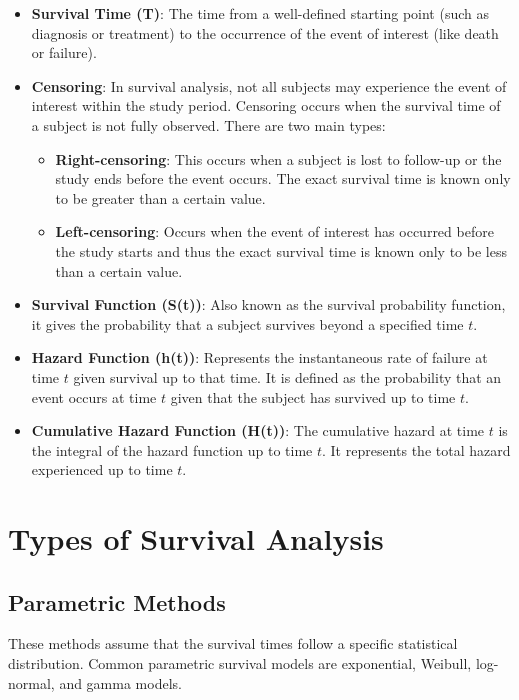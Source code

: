 \documentclass[12pt]{report}
\begin{document}
\begin{itemize}
    \item \textbf{Survival Time (T)}: The time from a well-defined starting point (such as diagnosis or treatment) to the occurrence of the event of interest (like death or failure).
    \item \textbf{Censoring}: In survival analysis, not all subjects may experience the event of interest within the study period. Censoring occurs when the survival time of a subject is not fully observed. There are two main types:
    \begin{itemize}
        \item \textbf{Right-censoring}: This occurs when a subject is lost to follow-up or the study ends before the event occurs. The exact survival time is known only to be greater than a certain value.
        \item \textbf{Left-censoring}: Occurs when the event of interest has occurred before the study starts and thus the exact survival time is known only to be less than a certain value.
    \end{itemize}
    \item \textbf{Survival Function (S(t))}: Also known as the survival probability function, it gives the probability that a subject survives beyond a specified time \( t \).
    \item \textbf{Hazard Function (h(t))}: Represents the instantaneous rate of failure at time \( t \) given survival up to that time. It is defined as the probability that an event occurs at time \( t \) given that the subject has survived up to time \( t \).
    \item \textbf{Cumulative Hazard Function (H(t))}: The cumulative hazard at time \( t \) is the integral of the hazard function up to time \( t \). It represents the total hazard experienced up to time \( t \).
\end{itemize}

\section{Types of Survival Analysis}
\subsection{Parametric Methods}
These methods assume that the survival times follow a specific statistical distribution. Common parametric survival models are exponential, Weibull, log-normal, and gamma models.
\end{document}

